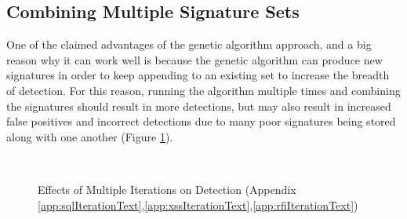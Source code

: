 \newpage
\subsection{Combining Multiple Signature Sets} \label{sec:resIteration}

One of the claimed advantages of the genetic algorithm approach, and a big reason why it can work well is because the genetic algorithm can produce new signatures in order to keep appending to an existing set to increase the breadth of detection.  For this reason, running the algorithm multiple times and combining the signatures should result in more detections, but may also result in increased false positives and incorrect detections due to many poor signatures being stored along with one another (Figure \ref{fig:resIterations}).

\begin{figure}[hb]
	\centering
	\\
	\caption{Effects of Multiple Iterations on Detection (Appendix \ref{app:sqlIterationText},\ref{app:xssIterationText},\ref{app:rfiIterationText})}
	\label{fig:resIterations}
\end{figure}

